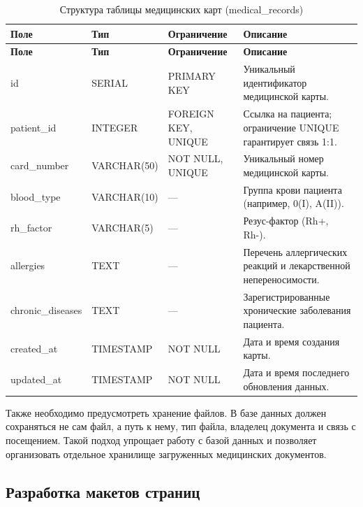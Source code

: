 {\small
\setlength{\tabcolsep}{4pt}
\renewcommand{\arraystretch}{1.12}
\begin{longtable}{|>{\raggedright\arraybackslash}p{}|>{\raggedright\arraybackslash}p{}|>{\raggedright\arraybackslash}p{}|>{\raggedright\arraybackslash}p{}|}
\caption{Структура таблицы медицинских карт (medical\_records)}\label{tab:medical_records}\\
\hline
\textbf{Поле} & \textbf{Тип} & \textbf{Ограничение} & \textbf{Описание} \\ \hline
\endfirsthead
\tabcont{\ref{tab:medical_records}}
\textbf{Поле} & \textbf{Тип} & \textbf{Ограничение} & \textbf{Описание} \\ \hline
\endhead
id & SERIAL & PRIMARY KEY & Уникальный идентификатор медицинской карты. \\ \hline
patient\_id & INTEGER & FOREIGN KEY, UNIQUE & Ссылка на пациента; ограничение UNIQUE гарантирует связь 1:1. \\ \hline
card\_number & VARCHAR(50) & NOT NULL, UNIQUE & Уникальный номер медицинской карты. \\ \hline
blood\_type & VARCHAR(10) & --- & Группа крови пациента (например, 0(I), A(II)). \\ \hline
rh\_factor & VARCHAR(5) & --- & Резус-фактор (Rh+, Rh-). \\ \hline
allergies & TEXT & --- & Перечень аллергических реакций и лекарственной непереносимости. \\ \hline
chronic\_diseases & TEXT & --- & Зарегистрированные хронические заболевания пациента. \\ \hline
created\_at & TIMESTAMP & NOT NULL & Дата и время создания карты. \\ \hline
updated\_at & TIMESTAMP & NOT NULL & Дата и время последнего обновления данных. \\ \hline
\end{longtable}
}

Также необходимо предусмотреть хранение файлов. В базе данных должен сохраняться не сам файл, а путь к нему, тип файла, владелец документа и связь с посещением. Такой подход упрощает работу с базой данных и позволяет организовать отдельное хранилище загруженных медицинских документов.

\subsection{Разработка макетов страниц}

